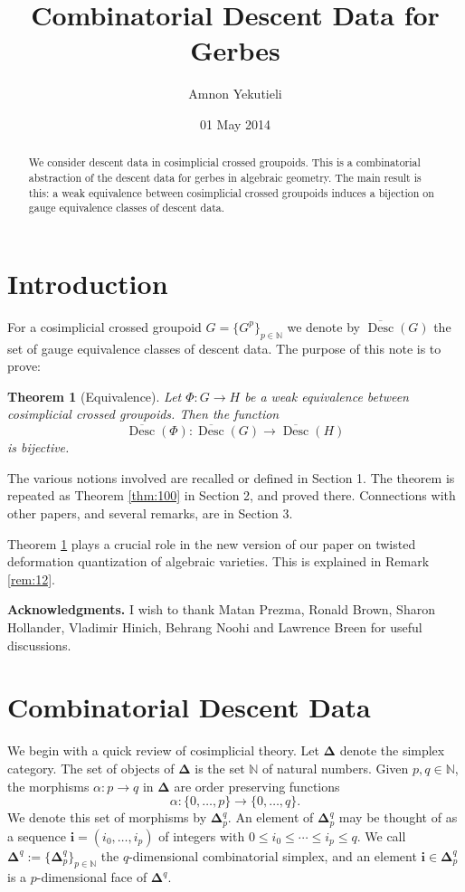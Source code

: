 \documentclass[a4paper,10pt]{amsart}
\date{01 May 2014}
\title[Combinatorial Descent Data]{Combinatorial Descent Data for Gerbes}
\author{Amnon Yekutieli}
\newtheorem{thm}[equation]{Theorem}
\theoremstyle{definition}
\numberwithin{equation}{section}
\newcommand{\opn}{\operatorname}
\newcommand{\ol}{\overline}
\newcommand{\mbb}[1]{\mathbb{#1}}
\newcommand{\bsym}[1]{\boldsymbol{#1}}
\begin{document}
\begin{abstract}
We consider descent data in cosimplicial crossed groupoids. This is a
combinatorial abstraction of the descent data for gerbes in algebraic geometry. 
The main result is this: a weak equivalence between
cosimplicial crossed groupoids induces a bijection on gauge equivalence classes
of descent data. 
\end{abstract}

\maketitle

\setcounter{section}{-1}
\section{Introduction}
\label{sec:Int}

For a cosimplicial crossed groupoid
$G = \{ G^p \}_{p \in \mbb{N}}$ 
we denote by 
$\ol{\opn{Desc}}(G)$
the set of gauge equivalence classes of descent data. 
The purpose of this note is to prove: 

\begin{thm}[Equivalence] \label{thm:1} 
Let $\Phi : G \to H$ be a weak equivalence between 
cosimplicial crossed groupoids. Then the function 
\[ \ol{\opn{Desc}}(\Phi) : \ol{\opn{Desc}}(G) \to
\ol{\opn{Desc}}(H) \]
is bijective.
\end{thm}

The various notions involved are recalled or defined in Section 1. The theorem
is repeated as Theorem \ref{thm:100} in Section 2, and proved there. Connections
with other papers, and several remarks, are in Section 3. 
 
Theorem \ref{thm:1} plays a crucial role in the new version of our paper 
\cite{Ye1} on twisted deformation quantization of algebraic varieties. This is
explained in Remark \ref{rem:12}.


\medskip \noindent
\textbf{Acknowledgments.}
I wish to thank Matan Prezma, Ronald Brown, Sharon Hollander, Vladimir Hinich,
Behrang Noohi and Lawrence Breen for useful discussions. 



\section{Combinatorial Descent Data}
\label{sec:cosim}

We begin with a quick review of cosimplicial theory. 
Let $\bsym{\Delta}$ denote the simplex category. The set
of objects of $\bsym{\Delta}$ is the set $\mbb{N}$ of natural
numbers. Given $p, q \in \mbb{N}$, the morphisms $\alpha : p \to q$
in $\bsym{\Delta}$ are order preserving functions
\[ \alpha : \{ 0, \ldots, p \} \to \{ 0, \ldots, q \} . \]
We denote this set of morphisms by
$\bsym{\Delta}^q_p$.
An element of $\bsym{\Delta}^q_p$ may be thought of as a sequence
$\bsym{i} = (i_0, \ldots, i_p)$ of integers with
$0 \leq i_0 \leq \cdots \leq i_p \leq q$. 
We call 
$\bsym{\Delta}^q := \{ \bsym{\Delta}^q_p \}_{p \in \mbb{N}}$
the $q$-dimensional combinatorial simplex, and an element
$\bsym{i} \in \bsym{\Delta}^q_p$ is a $p$-dimensional face of
$\bsym{\Delta}^q$.
\end{document}
